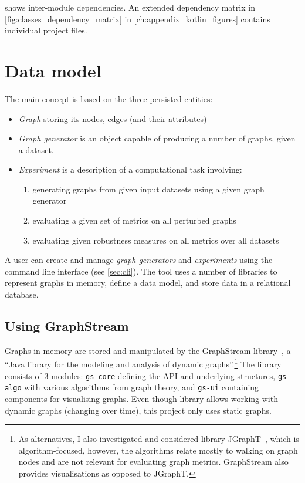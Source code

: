  shows inter-module dependencies.
An extended dependency matrix in \cref{fig:classes_dependency_matrix} in \cref{ch:appendix_kotlin_figures} contains individual project files.

\section{Data model}

The main concept is based on the three persisted entities:
\begin{itemize}[topsep=5pt]
    \item \textsl{Graph} storing its nodes, edges (and their attributes)
    \item \textsl{Graph generator} is an object capable of producing a number of graphs, given a dataset.
    \item \textsl{Experiment} is a description of a computational task involving:
    \begin{enumerate}[topsep=0pt,itemsep=0pt]
        \item generating graphs from given input datasets using a given graph generator
        \item evaluating a given set of metrics on all perturbed graphs
        \item evaluating given robustness measures on all metrics over all datasets
    \end{enumerate}
\end{itemize}

A user can create and manage \textsl{graph generators} and \textsl{experiments} using the command line interface (see \autoref{sec:cli}).
The \graffs tool uses a number of libraries to represent graphs in memory, define a data model, and store data in a relational database.

\subsection{Using GraphStream}\label{sec:graphstream}

Graphs in memory are stored and manipulated by the GraphStream library~\cite{DutotGraphStreamToolBridging2007}, a \enquote{Java library for the modeling and analysis of dynamic graphs}.\footnote{As alternatives, I also investigated and considered library JGraphT~\cite{Michail2019}, which is algorithm-focused, however, the algorithms relate mostly to walking on graph nodes and are not relevant for evaluating graph metrics.
GraphStream also provides visualisations as opposed to JGraphT.}
The library consists of 3 modules: \texttt{gs-core} defining the API and underlying structures, \texttt{gs-algo} with various algorithms from graph theory, and \texttt{gs-ui} containing components for visualising graphs.
Even though library allows working with dynamic graphs (changing over time), this project only uses static graphs.

